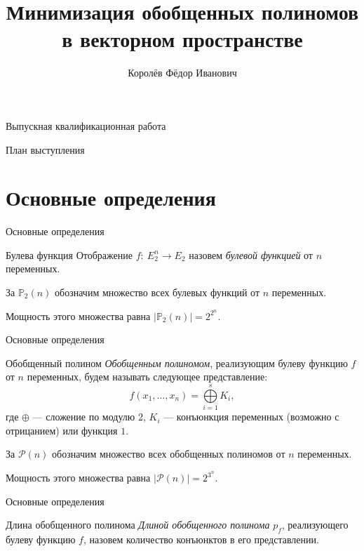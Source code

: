 \documentclass{beamer}
\title{Минимизация обобщенных полиномов в векторном пространстве}
\author[Королёв~Ф.И.]{Королёв Фёдор Иванович}
\institute[МГУ им. М.В.~Ломоносова]{Московский государственный университет имени М.В.~Ломоносова}
\begin{document}
\begin{frame}{Выпускная квалификационная работа}
\titlepage
\end{frame}

\begin{frame}{План выступления}
\tableofcontents
\end{frame}

\section[Определения]{Основные определения}
\begin{frame}{Основные определения}

\begin{block}{Булева функция}
Отображение $ f:\ E_2^n \rightarrow E_2 $ назовем \textit{булевой функцией} от $ n $ переменных.

За $ \mathbb{P}_2(n) $ обозначим множество всех булевых функций от $ n $ переменных.

Мощность этого множества равна $ \left| \mathbb{P}_2(n) \right| = 2^{2^n}$.
\end{block}

\end{frame}
\begin{frame}{Основные определения}

\begin{block}{Обобщенный полином}
\textit{Обобщенным полиномом}, реализующим булеву функцию $ f $ от $ n $ переменных, будем называть следующее представление:
$$ f(x_1, \dots, x_n) = \bigoplus\limits_{i = 1}^s K_i, $$
где $ \oplus $ --- сложение по модулю 2, $ K_i $ --- конъюнкция переменных (возможно с отрицанием) или функция $ 1 $.

За $ \mathcal{P}(n) $ обозначим множество всех обобщенных полиномов от $ n $ переменных.

Мощность этого множества равна $ \left| \mathcal{P}(n) \right| = 2^{3^n} $.
\end{block}

\end{frame}
\begin{frame}{Основные определения}

\begin{block}{Длина обобщенного полинома}
\textit{Длиной обобщенного полинома} $ p_f $, реализующего булеву функцию $ f $, назовем количество конъюнктов в его представлении.
\end{block}

\end{frame}
\end{document}
